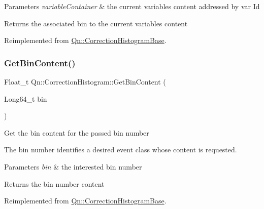 \begin{DoxyParams}{Parameters}
{\em variable\+Container} & the current variables content addressed by var Id \\
\hline
\end{DoxyParams}
\begin{DoxyReturn}{Returns}
the associated bin to the current variables content 
\end{DoxyReturn}


Reimplemented from \mbox{\hyperlink{classQn_1_1CorrectionHistogramBase_ab1f64550f4e1812864da6f9f6ea565e6}{Qn\+::\+Correction\+Histogram\+Base}}.

\mbox{\label{classQn_1_1CorrectionHistogram_a469c7ca13b740d1224dcaf5c9a41eb2b}} 
\subsubsection{\texorpdfstring{Get\+Bin\+Content()}{GetBinContent()}}
{\footnotesize\ttfamily Float\+\_\+t Qn\+::\+Correction\+Histogram\+::\+Get\+Bin\+Content (\begin{DoxyParamCaption}\item[{Long64\+\_\+t}]{bin }\end{DoxyParamCaption})\hspace{0.3cm}{\ttfamily [virtual]}}

Get the bin content for the passed bin number

The bin number identifies a desired event class whose content is requested.


\begin{DoxyParams}{Parameters}
{\em bin} & the interested bin number \\
\hline
\end{DoxyParams}
\begin{DoxyReturn}{Returns}
the bin number content 
\end{DoxyReturn}


Reimplemented from \mbox{\hyperlink{classQn_1_1CorrectionHistogramBase_a9e4e745a6f4cbebf5b9277d6d63bc9c7}{Qn\+::\+Correction\+Histogram\+Base}}.

\mbox{\label{classQn_1_1CorrectionHistogram_ac9feeeb4721f0b199c5c96e41224836e}} 

